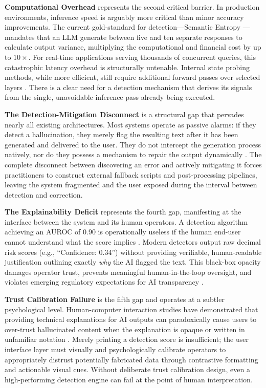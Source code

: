 \documentclass{article}
\begin{document}
\textbf{Computational Overhead} represents the second critical barrier. In production environments, inference speed is arguably more critical than minor accuracy improvements. The current gold-standard for detection---Semantic Entropy \cite{farquhar2024semantic}---mandates that an LLM generate between five and ten separate responses to calculate output variance, multiplying the computational and financial cost by up to $10\times$. For real-time applications serving thousands of concurrent queries, this catastrophic latency overhead is structurally untenable. Internal state probing methods, while more efficient, still require additional forward passes over selected layers \cite{su2024mind,zhang2024prism}. There is a clear need for a detection mechanism that derives its signals from the single, unavoidable inference pass already being executed.

\textbf{The Detection-Mitigation Disconnect} is a structural gap that pervades nearly all existing architectures. Most systems operate as passive alarms: if they detect a hallucination, they merely flag the resulting text after it has been generated and delivered to the user. They do not intercept the generation process natively, nor do they possess a mechanism to repair the output dynamically \cite{wu2025behcal}. The complete disconnect between discovering an error and actively mitigating it forces practitioners to construct external fallback scripts and post-processing pipelines, leaving the system fragmented and the user exposed during the interval between detection and correction.

\textbf{The Explainability Deficit} represents the fourth gap, manifesting at the interface between the system and its human operators. A detection algorithm achieving an AUROC of 0.90 is operationally useless if the human end-user cannot understand what the score implies \cite{herrera2025xai}. Modern detectors output raw decimal risk scores (e.g., ``Confidence: 0.34'') without providing verifiable, human-readable justification outlining exactly \textit{why} the AI flagged the text. This black-box opacity damages operator trust, prevents meaningful human-in-the-loop oversight, and violates emerging regulatory expectations for AI transparency \cite{huang2024trustllm,gunning2019darpa}.

\textbf{Trust Calibration Failure} is the fifth gap and operates at a subtler psychological level. Human-computer interaction studies have demonstrated that providing technical explanations for AI outputs can paradoxically cause users to over-trust hallucinated content when the explanation is opaque or written in unfamiliar notation \cite{sharma2024trust}. Merely printing a detection score is insufficient; the user interface layer must visually and psychologically calibrate operators to appropriately distrust potentially fabricated data through contrastive formatting and actionable visual cues. Without deliberate trust calibration design, even a high-performing detection engine can fail at the point of human interpretation.
\end{document}

